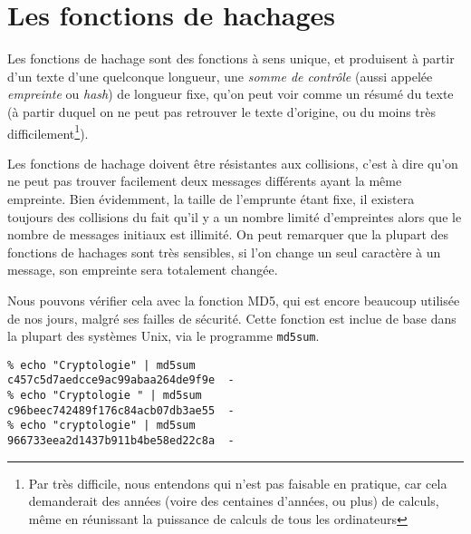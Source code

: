 \section{Les fonctions de hachages\label{sec:FonctionHachage}}
Les fonctions de hachage sont des fonctions à sens unique, et
produisent à partir d'un texte d'une quelconque longueur, une 
\emph{somme de contrôle} (aussi appelée \emph{empreinte}
ou \emph{hash}) de longueur fixe, qu'on peut voir comme un résumé
du texte (à partir duquel on ne peut pas retrouver le texte
d'origine, ou du moins très difficilement\footnote{Par très
difficile, nous entendons qui n'est pas faisable en pratique, car
cela demanderait des années (voire des centaines d'années, ou
plus) de calculs, même en réunissant la puissance de calculs de
tous les ordinateurs}).

Les fonctions de hachage doivent être résistantes aux collisions,
c'est à dire qu'on ne peut pas trouver facilement deux messages
différents ayant la même empreinte. Bien évidemment, la taille de
l'emprunte étant fixe, il existera toujours des collisions du fait
qu'il y a un nombre limité d'empreintes alors que le nombre de
messages initiaux est illimité.
On peut remarquer que la plupart des fonctions de hachages sont
très sensibles, si l'on change un seul caractère à un message, son
empreinte sera totalement changée.

Nous pouvons vérifier cela avec
la fonction MD5, qui est encore beaucoup utilisée de nos jours,
malgré ses failles de sécurité. Cette fonction est inclue de base
dans la plupart des systèmes Unix, via le programme \texttt{md5sum}.

\lstset{language=bash}
\begin{lstlisting}
% echo "Cryptologie" | md5sum
c457c5d7aedcce9ac99abaa264de9f9e  -
% echo "Cryptologie " | md5sum
c96beec742489f176c84acb07db3ae55  -
% echo "cryptologie" | md5sum
966733eea2d1437b911b4be58ed22c8a  -
\end{lstlisting}

